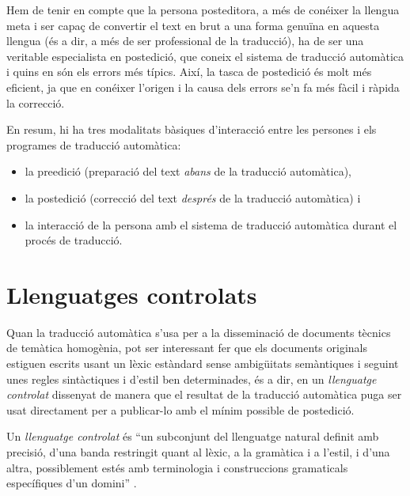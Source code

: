   Hem de tenir en compte que la persona posteditora, a més de conéixer
  la llengua meta i ser capaç de convertir el text en brut a una forma
  genuïna en aquesta llengua (és a dir, a més de ser professional de
  la traducció), ha de ser una veritable especialista en postedició,
  que coneix el sistema de traducció automàtica i quins en són els
  errors més típics. Així, la tasca de postedició és molt més
  eficient, ja que en conéixer l'origen i la causa dels errors se'n fa
  més fàcil i ràpida la correcció.

En resum, hi ha tres modalitats bàsiques d'interacció entre les
persones i els programes de traducció automàtica:
\begin{itemize}
\item la preedició (preparació del text \emph{abans} de la traducció
  automàtica),
\item la postedició (correcció del text \emph{després} de la
  traducció automàtica) i
\item la interacció de la persona amb el sistema de traducció
  automàtica durant el procés de traducció.
\end{itemize}


\section{Llenguatges controlats}
\label{ss:llecon}

Quan la traducció automàtica s'usa per a la disseminació de documents
tècnics de temàtica homogènia, pot ser interessant fer que els
documents originals estiguen escrits usant un lèxic estàndard sense
ambigüitats semàn\-ti\-ques i seguint unes regles sintàctiques i
d'estil ben determinades, és a dir, en un \emph{llenguatge controlat}
\citep{wojcik96u,arnold94b,o2003controlling} dissenyat de manera que
el resultat de la traducció automàtica puga ser usat directament per a
publicar-lo amb el mínim possible de postedició.

Un \emph{llenguatge controlat} és ``un subconjunt del llenguatge natural
definit amb precisió, d'una banda restringit quant al lèxic, a la
gramàtica i a l'estil, i d'una altra, possiblement estés amb
terminologia i construccions gramaticals específiques d'un domini''
\citep{huijsen98u}. 


